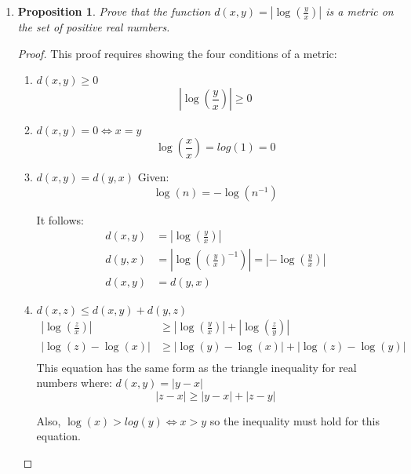 \documentclass[12pt,a4paper,reqno,parskip=full]{amsart}
\numberwithin{equation}{section}
\theoremstyle{plain}
\newtheorem{proposition}[subsection]{Proposition}
\theoremstyle{definition}
\renewcommand{\leq}{\leqslant}
\renewcommand{\geq}{\geqslant}
\begin{document}
\begin{enumerate}
\begin{proof}
          In all of the cases, and only the cases, where $x \notin A\cap B$ and $x \in S$, is
          $2x^2-5x$ either positive and even or negative and odd.
        \end{proof}

  \item
        \begin{proposition}
          Prove that the function $d(x,y) = \left|\log\left(\frac{y}{x}\right)\right|$
          is a metric on the set of positive real numbers.
        \end{proposition}
        \begin{proof} This proof requires showing the four conditions of a metric:
          \begin{enumerate}
            \item $d(x,y) \geq 0$
                  \[
                    \left|\log\left(\frac{y}{x}\right)\right| \geq 0
                  \]
            \item $d(x,y) = 0 \iff x = y$
                  \[
                    \log\left(\frac{x}{x}\right) = log(1) = 0
                  \]
            \item $d(x,y) = d(y,x)$
                  Given:
                  \[\log(n) = -\log(n^{-1})\]

                  It follows:
                  \begin{align*}
                    d(x,y) & = \left|\log\left(\frac{y}{x}\right)\right|                                                     \\
                    d(y,x) & = \left|\log\left((\frac{y}{x})^{-1}\right)\right| = \left|-\log\left(\frac{y}{x}\right)\right| \\
                    d(x,y) & = d(y,x)
                  \end{align*}
            \item{$d(x,z) \leq d(x,y) + d(y,z)$}
                  \begin{align*}
                    \left|\log\left(\frac{z}{x}\right)\right| & \geq \left|\log\left(\frac{y}{x}\right)\right| + \left|\log\left(\frac{z}{y}\right)\right| \\
                    |\log(z) - \log(x)|                       & \geq |\log(y) - \log(x)| + |\log(z) - \log(y)|                                             \\
                  \end{align*}
                  This equation has the same form as the triangle inequality for real numbers where: $d(x, y) = |y - x|$
                  \[|z - x|\geq |y - x| + |z - y|\]

                  Also, $\log(x) > log(y) \iff x > y$ so the inequality must hold for this equation.
          \end{enumerate}
        \end{proof}
\end{enumerate}
\end{document}
